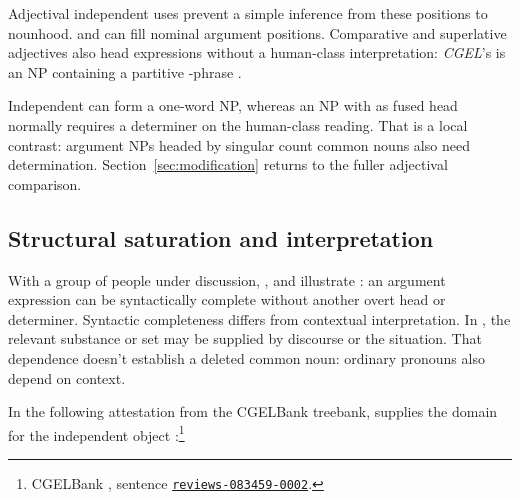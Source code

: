 \documentclass[12pt]{article}
\begin{document}
\begin{samepage}
\ea\label{ex:external}
\ea {}\qquad {}\qquad {}
\ex {}\qquad {}\qquad {}
\ex {}\qquad {}\qquad {}
\ex {}\qquad {}\qquad {}
\z\z
\end{samepage}

Adjectival independent uses prevent a simple inference from these positions to nounhood.  and  can fill nominal argument positions. Comparative and superlative adjectives also head expressions without a human-class interpretation: \textit{CGEL}'s  is an NP containing a partitive -phrase \citep[332--333, 416--423]{huddleston2002}.

Independent  can form a one-word NP, whereas an NP with  as fused head normally requires a determiner on the human-class reading. That is a local contrast: argument NPs headed by singular count common nouns also need determination. Section~\ref{sec:modification} returns to the fuller adjectival comparison.

\subsection{Structural saturation and interpretation}

With a group of people under discussion, ,  and  illustrate : an argument expression can be syntactically complete without another overt head or determiner. Syntactic completeness differs from contextual interpretation. In , the relevant substance or set may be supplied by discourse or the situation. That dependence doesn't establish a deleted common noun: ordinary pronouns also depend on context.

In the following attestation from the CGELBank treebank,  supplies the domain for the independent object :\footnote{CGELBank \citep{reynolds2023unified}, sentence \href{https://github.com/nert-nlp/cgel/blob/d0a2c2d8c522b23d5aa879fc9cb94948f4285b2c/datasets/ewt.cgel\#L651-L654}{\nolinkurl{reviews-083459-0002}}.}
\ea\label{ex:attested-both}
\z
\end{document}
